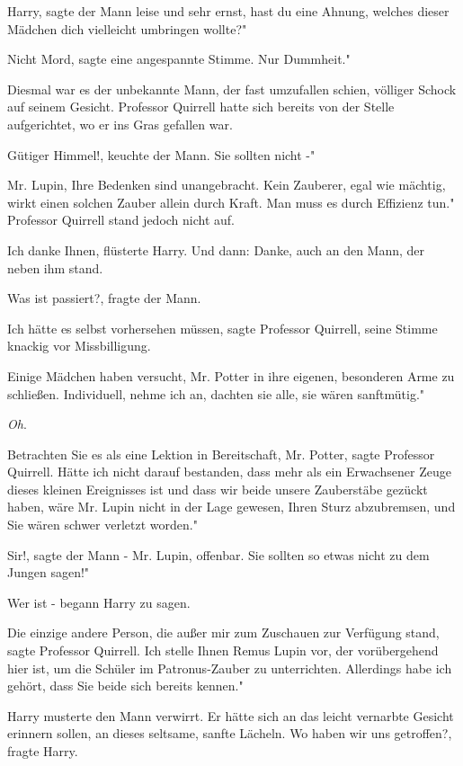 \glqq Harry\grqq{}, sagte der Mann leise und sehr ernst, \glqq hast du eine
Ahnung, welches dieser Mädchen dich vielleicht umbringen wollte?"

\glqq Nicht Mord\grqq{}, sagte eine angespannte Stimme. \glqq Nur Dummheit."

Diesmal war es der unbekannte Mann, der fast umzufallen schien, völliger Schock
auf seinem Gesicht. Professor Quirrell hatte sich bereits von der Stelle
aufgerichtet, wo er ins Gras gefallen war.

\glqq Gütiger Himmel!\grqq{}, keuchte der Mann. \glqq Sie sollten nicht -"

\glqq Mr. Lupin, Ihre Bedenken sind unangebracht. Kein Zauberer, egal wie
mächtig, wirkt einen solchen Zauber allein durch Kraft. Man muss es durch
Effizienz tun." Professor Quirrell stand jedoch nicht auf.

\glqq Ich danke Ihnen\grqq{}, flüsterte Harry. Und dann: \glqq Danke\grqq{},
auch an den Mann, der neben ihm stand.

\glqq Was ist passiert?\grqq{}, fragte der Mann.

\glqq Ich hätte es selbst vorhersehen müssen\grqq{}, sagte Professor Quirrell,
seine Stimme knackig vor Missbilligung.

\glqq Einige Mädchen haben versucht, Mr. Potter in ihre eigenen, besonderen Arme
zu schließen. Individuell, nehme ich an, dachten sie alle, sie wären
sanftmütig."

\emph{Oh}.

\glqq Betrachten Sie es als eine Lektion in Bereitschaft, Mr. Potter\grqq{},
sagte Professor Quirrell. \glqq Hätte ich nicht darauf bestanden, dass mehr als
ein Erwachsener Zeuge dieses kleinen Ereignisses ist und dass wir beide unsere
Zauberstäbe gezückt haben, wäre Mr. Lupin nicht in der Lage gewesen, Ihren Sturz
abzubremsen, und Sie wären schwer verletzt worden."

\glqq Sir!\grqq{}, sagte der Mann - Mr. Lupin, offenbar. \glqq Sie sollten so
etwas nicht zu dem Jungen sagen!"

\glqq Wer ist -\grqq{} begann Harry zu sagen.

\glqq Die einzige andere Person, die außer mir zum Zuschauen zur Verfügung
stand\grqq{}, sagte Professor Quirrell. \glqq Ich stelle Ihnen Remus Lupin vor,
der vorübergehend hier ist, um die Schüler im Patronus-Zauber zu unterrichten.
Allerdings habe ich gehört, dass Sie beide sich bereits kennen."

Harry musterte den Mann verwirrt. Er hätte sich an das leicht vernarbte Gesicht
erinnern sollen, an dieses seltsame, sanfte Lächeln. \glqq Wo haben wir uns
getroffen?\grqq{}, fragte Harry.

